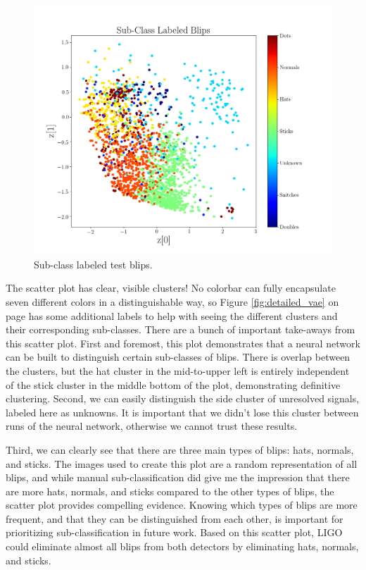 \documentclass[a4paper]{article}
\begin{document}
\begin{figure}[h!]
	\centering
	\includegraphics[width=.8\linewidth]{vae_test_labeled4}
	\caption{Sub-class labeled test blips.}
	\label{fig:final_vae}
\end{figure}

The scatter plot has clear, visible clusters! No colorbar can fully encapsulate seven different colors in a distinguishable way, so Figure \ref{fig:detailed_vae} on page \pageref{fig:detailed_vae} has some additional labels to help with seeing the different clusters and their corresponding sub-classes. There are a bunch of important take-aways from this scatter plot. First and foremost, this plot demonstrates that a neural network can be built to distinguish certain sub-classes of blips. There is overlap between the clusters, but the hat cluster in the mid-to-upper left is entirely independent of the stick cluster in the middle bottom of the plot, demonstrating definitive clustering. Second, we can easily distinguish the side cluster of unresolved signals, labeled here as unknowns. It is important that we didn't lose this cluster between runs of the neural network, otherwise we cannot trust these results. 

Third, we can clearly see that there are three main types of blips: hats, normals, and sticks. The images used to create this plot are a random representation of all blips, and while manual sub-classification did give me the impression that there are more hats, normals, and sticks compared to the other types of blips, the scatter plot provides compelling evidence. Knowing which types of blips are more frequent, and that they can be distinguished from each other, is important for prioritizing sub-classification in future work. Based on this scatter plot, LIGO could eliminate almost all blips from both detectors by eliminating hats, normals, and sticks. 
\end{document}
